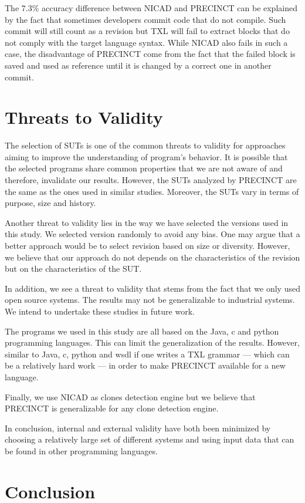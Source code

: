 \documentclass[conference]{IEEEtran}
\begin{document}
The 7.3\% accuracy difference between NICAD and PRECINCT can be explained by the fact that sometimes developers commit code that do not compile.
Such commit will still count as a revision but TXL will fail to extract blocks that do not comply with the target language syntax.
While NICAD also fails in such a case, the disadvantage of PRECINCT come from the fact that the failed block is saved and used as reference until it is changed by a correct one in another commit.

\section{Threats to Validity}
\label{sec:Threats to Validity}

The selection of SUTs is one of the common threats to validity for approaches aiming to improve the understanding of program's behavior.
It is possible that the selected programs share common properties that we are not aware of and therefore, invalidate our results.
However, the SUTs analyzed by PRECINCT are the same as the ones used in similar studies.
Moreover, the SUTs vary in terms of purpose, size and history.

Another threat to validity lies in the way we have selected the versions used in this study.
We selected version randomly to avoid any bias.
One may argue that a better approach would be to select revision based on size or diversity.
However, we believe that our approach do not depends on the characteristics of the revision but on the characteristics of the SUT.

In addition, we see a threat to validity that stems from the fact that we only used open source systems. The results may not be generalizable to industrial systems. We intend to undertake these studies in future work.

The programs we used in this study are all based on the Java, c and python programming languages. This can limit the generalization of the results. However, similar to Java, c, python and wsdl if one writes a TXL grammar --- which can be a relatively hard work --- in order to make PRECINCT available for a new language.

Finally, we use NICAD as clones detection engine but we believe that PRECINCT is generalizable for any clone detection engine.

In conclusion, internal and external validity have both been minimized by choosing a relatively large set of different systems and using input data that can be found in other programming languages.



\section{Conclusion}
\label{sec:Conclusion}









\end{document}

